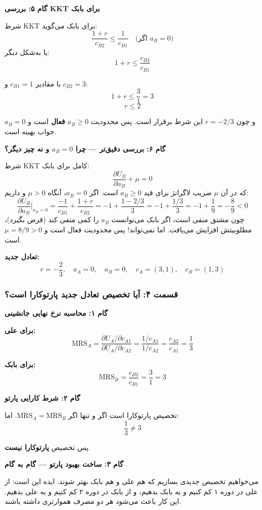 \documentclass[12pt,a4paper]{article}
\newcommand{\MRS}{\mathrm{MRS}}
\begin{document}
\textbf{گام ۵: بررسی KKT برای بابک}

شرط KKT برای بابک می‌گوید:
\[
	\frac{1+r}{c_{B2}} \leq \frac{1}{c_{B1}} \quad \text{(اگر } a_B = 0 \text{)}
\]
یا به‌شکل دیگر:
\[
	1+r \leq \frac{c_{B2}}{c_{B1}}
\]

با مقادیر $c_{B1} = 1$ و $c_{B2} = 3$:
\[
	1+r \leq \frac{3}{1} = 3
\]
\[
	r \leq 2
\]

و چون $r = -2/3$ این شرط برقرار است. پس محدودیت $a_B \geq 0$ \textbf{فعال} است و $a_B = 0$ جواب بهینه است.

\textbf{گام ۶: بررسی دقیق‌تر — چرا $a_B = 0$ و نه چیز دیگر؟}

شرط KKT کامل برای بابک:
\[
	\frac{\partial U_B}{\partial a_B} + \mu = 0
\]
که در آن $\mu$ ضریب لاگرانژ برای قید $a_B \geq 0$ است. اگر $a_B = 0$، آنگاه $\mu > 0$ و داریم:
\[
	\frac{\partial U_B}{\partial a_B} \bigg|_{a_B=0} = \frac{-1}{c_{B1}} + \frac{1+r}{c_{B2}} = -1 + \frac{1-2/3}{3} = -1 + \frac{1/3}{3} = -1 + \frac{1}{9} = -\frac{8}{9} < 0
\]
چون مشتق منفی است، اگر بابک می‌توانست $a_B$ را کمی منفی کند (قرض بگیرد)، مطلوبیتش افزایش می‌یافت. اما نمی‌تواند! پس محدودیت فعال است و $\mu = 8/9 > 0$ است.

\textbf{تعادل جدید:}
\[
	\boxed{r = -\frac{2}{3}, \quad a_A = 0, \quad a_B = 0, \quad c_A = (3, 1), \quad c_B = (1, 3)}
\]

\subsubsection{قسمت ۴: آیا تخصیص تعادل جدید پارتوکارا است؟}

\textbf{گام ۱: محاسبه نرخ نهایی جانشینی}

\textbf{برای علی:}
\[
	\MRS_A = \frac{\partial U_A / \partial c_{A1}}{\partial U_A / \partial c_{A2}} = \frac{1/c_{A1}}{1/c_{A2}} = \frac{c_{A2}}{c_{A1}} = \frac{1}{3}
\]

\textbf{برای بابک:}
\[
	\MRS_B = \frac{c_{B2}}{c_{B1}} = \frac{3}{1} = 3
\]

\textbf{گام ۲: شرط کارایی پارتو}

تخصیص پارتوکارا است اگر و تنها اگر $\MRS_A = \MRS_B$. اما:
\[
	\frac{1}{3} \neq 3
\]

پس تخصیص \textbf{پارتوکارا نیست}.

\textbf{گام ۳: ساخت بهبود پارتو — گام به گام}

می‌خواهیم تخصیص جدیدی بسازیم که هم علی و هم بابک بهتر شوند. ایده این است: از علی در دوره ۱ کم کنیم و به بابک بدهیم، و از بابک در دوره ۲ کم کنیم و به علی بدهیم. این کار باعث می‌شود هر دو مصرف هموارتری داشته باشند.
\end{document}
